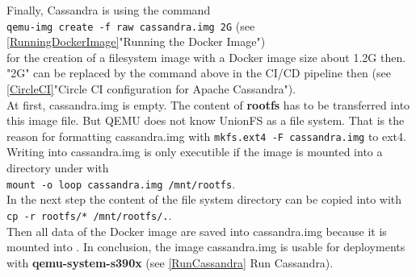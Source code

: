 Finally, Cassandra is using the command \\
\lstinline!qemu-img create -f raw cassandra.img 2G! (see \ref{RunningDockerImage}"Running the Docker Image") \\
for the creation of a filesystem image with a Docker image size about 1.2G then. "2G" can be replaced by the command above in the CI/CD pipeline then (see \ref{CircleCI}"Circle CI configuration for Apache Cassandra"). \\
At first, cassandra.img is empty. The content of \textbf{rootfs} has to be transferred into this image file. But QEMU does not know UnionFS as a file system. That is the reason for formatting cassandra.img with \lstinline!mkfs.ext4 -F cassandra.img! to ext4. Writing into cassandra.img is only executible if the image is mounted into a directory under  with \\
\lstinline!mount -o loop cassandra.img /mnt/rootfs!. \\ 
In the next step the content of the file system directory can be copied into  with \\ 
\lstinline!cp -r rootfs/* /mnt/rootfs/.!. \\ 
Then all data of the Docker image are saved into cassandra.img because it is mounted into . In conclusion, the image cassandra.img is usable for deployments with \textbf{qemu-system-s390x} (see \ref{RunCassandra} Run Cassandra). 